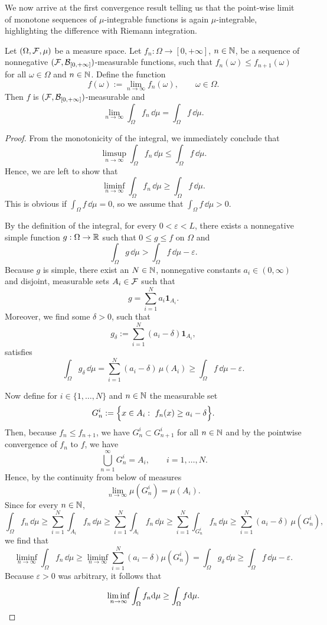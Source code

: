 We now arrive at the first convergence result telling us that the point-wise limit of monotone sequences of $\mu$-integrable functions is again $\mu$-integrable, highlighting the difference with Riemann integration.


\begin{theorem}
	\label{th:monotone-convergence-I}
	Let $(\Omega, \mathcal F, \mu)$ be a measure space. Let $f_n\colon\Omega \to [0,+\infty]$, $n \in \mathbb N$, be a sequence of nonnegative $(\mathcal F,\mathcal B_{[0,+\infty]})$-measurable functions, such that $f_n(\omega) \leq f_{n+1}(\omega)$ for all $\omega \in \Omega$ and $n \in \mathbb N$. Define the function 
	\[
		f(\omega) := \lim_{n \to \infty} f_n(\omega),\qquad \omega\in\Omega.
	\]
	Then $f$ is $(\mathcal F,\mathcal B_{[0,+\infty]})$-measurable and
	\[
	\lim_{n \to \infty} \int_\Omega f_n\, \dd \mu = \int_\Omega f\, \dd \mu.
	\]
\end{theorem}

\begin{proof}
	From the monotonicity of the integral, we immediately conclude that
	\[
	\limsup_{n \to \infty} \int_\Omega f_n\, \dd \mu \leq \int_\Omega f\, \dd \mu.
	\]
	Hence, we are left to show that
	\[
	\liminf_{n \to \infty } \int_\Omega f_n\, \dd \mu \geq \int_\Omega f\, \dd \mu.
	\]
	This is obvious if $\int_\Omega f\, \dd \mu = 0$, so we assume that $\int_\Omega f\, \dd \mu >0$.
	
	By the definition of the integral, for every $0<\varepsilon<L$, there exists a nonnegative simple function $g: \Omega \to \mathbb R$ such that $0\le g \leq f$ on $\Omega$ and
	\[
		\int_\Omega g\, \dd \mu > \int_\Omega f\, \dd \mu - \varepsilon.
	\]
	Because $g$ is simple, there exist an $N \in \mathbb N$, nonnegative constants $a_i \in (0,\infty)$ and disjoint, measurable sets $A_i \in \mathcal F$ such that
	\[
		g = \sum_{i=1}^N a_i \mathbf{1}_{A_i}.
	\]
	Moreover, we find some $\delta>0$, such that
	\[
		g_\delta:= \sum_{i=1}^N (a_i-\delta)\mathbf{1}_{A_i}, 
	\]
	satisfies
	\[
		\int_\Omega g_\delta\,\dd \mu = \sum_{i=1}^N(a_i-\delta)\,\mu(A_i) \ge \int_\Omega f\,\dd\mu - \varepsilon. 
	\]
	
	Now define for $i \in \{ 1, \dots, N\}$ and $n \in \mathbb N$ the measurable set
	\[
	G_n^i := \Bigl\{ x \in A_i : \ f_n(x) \geq a_i - \delta \Bigr\}.
	\]
	Then, because $f_n \leq f_{n+1}$, we have $G_n^i \subset G_{n+1}^i$ for all $n \in \mathbb N$ and by the pointwise convergence of $f_n$ to $f$, we have
	\[
	\bigcup_{n=1}^\infty G_n^i = A_i,\qquad i=1,\ldots,N.
	\]
	Hence, by the continuity from below of measures
	\[
		\lim_{n \to \infty}\mu(G_n^i) = \mu(A_i).
	\]
	Since for every $n\in\mathbb N$,
		\[
		\int_\Omega f_n\,\dd\mu \ge \sum_{i=1}^N \int_{A_i} f_n\,\dd \mu \ge \sum_{i=1}^N \int_{A_i} f_n\,\dd \mu \ge \sum_{i=1}^N \int_{G_n^i} f_n\,\dd \mu \ge \sum_{i=1}^N (a_i-\delta)\,\mu(G_n^i),
	\]
	we find that
	\[
		\liminf_{n \to \infty} \int_\Omega f_n\, \dd \mu \ge  \liminf_{n \to \infty } \sum_{i=1}^N (a_i - \delta) \mu(G_n^i) = \int_\Omega g_\delta\,\dd\mu \ge \int_\Omega f\,\dd\mu - \varepsilon. 
	\]
	Because $\varepsilon>0$ was arbitrary, it follows that
	\[
	\liminf_{n \to \infty} \int_\Omega f_n \mathrm{d} \mu \geq \int_\Omega f \mathrm{d} \mu.\qedhere
	\]	
\end{proof}

